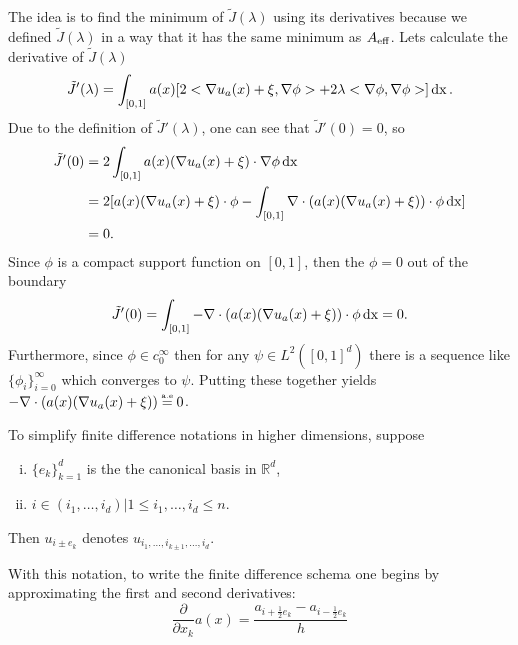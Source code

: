 The idea is to find the minimum of $\tilde{J}(\lambda)$ using its derivatives because we defined $\tilde{J}(\lambda)$ in a way that it has the same minimum as $A_{\operatorname{eff}}$. Lets calculate the derivative of $\tilde{J}(\lambda)$ 
\begin{equation}
	\tilde{J}'(\lambda)= \int_{[0,1]} a(x) [2<\nabla u_{a}(x)+\xi, \nabla\phi> + 2\lambda <\nabla\phi,\nabla\phi>] \operatorname{dx}.
\end{equation}
Due to the definition of $\tilde{J}'(\lambda)$, one can see that $\tilde{J}'(0) = 0$, so
\begin{align}
	\tilde{J}'(0) &= 2\int_{[0,1]} a(x) (\nabla u_{a}(x)+\xi) \cdot \nabla\phi \operatorname{dx}\\
	&= 2 [a(x)(\nabla u_{a}(x)+\xi) \cdot \phi - \int_{[0,1]} \nabla \cdot(a(x) (\nabla u_{a}(x)+\xi))\cdot \phi \operatorname{dx}]\\ &= 0.
\end{align}
Since $\phi$ is a compact support function on $[0,1]$, then the $\phi = 0$ out of the boundary
\begin{equation}
	\tilde{J}'(0) = \int_{[0,1]} - \nabla \cdot(a(x) (\nabla u_{a}(x)+\xi))\cdot \phi \operatorname{dx} = 0.
\end{equation}
Furthermore, since $\phi \in c_{0}^{\infty}$ then for any $\psi \in L^{2}([0,1]^d)$ there is a sequence like $\{\phi_{i}\}_{i=0}^{\infty}$ which converges to $\psi$. Putting these together yields\\ $- \nabla \cdot(a(x) (\nabla u_{a}(x)+\xi))\aeeq0$.\\
\begin{notation}
	To simplify finite difference notations in higher dimensions, suppose
	\begin{enumerate}[i.]
		\item $\{e_{k}\}_{k=1}^{d}$ is the the canonical basis in $\mathbb{R}^{d}$,
		\item $i \in {(i_1, \dots, i_d) \vert 1 \leq i_1, \dots, i_d \leq n}$. 
	\end{enumerate}
	Then $u_{i \pm e_k }$ denotes $u_{i_1, \dots, i_{k \pm 1}, \dots, i_d}$.
\end{notation}
With this notation, to write the finite difference schema one begins by approximating the first and second derivatives: 
\begin{equation}
	\frac{\partial}{\partial x_k} a(x) = \frac{a_{i+\frac{1}{2}e_{k}} - a_{i-\frac{1}{2}e_{k}}}{h}
\end{equation}
